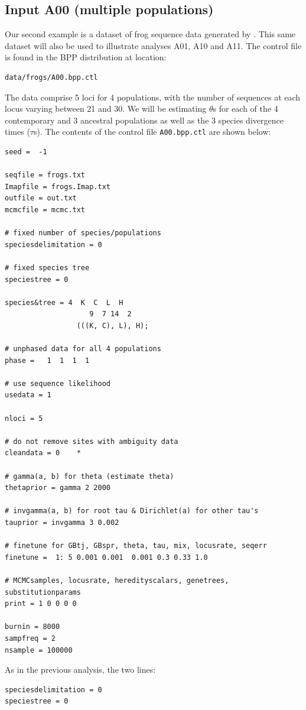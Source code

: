 \documentclass{book}
\numberwithin{equation}{section} \renewcommand{\baselinestretch}{0.55}
\begin{document}
\subsection{Input A00 (multiple populations)}
Our second example is a dataset of frog sequence data generated by \cite{Zhou2012}.
This same dataset will also be used to illustrate analyses A01, A10 and A11.
The control file is found in the BPP distribution at location:
\begin{verbatim}
data/frogs/A00.bpp.ctl
\end{verbatim}
The data comprise 5 loci for 4 populations, with the number of sequences at each locus varying
between 21 and 30. We will be estimating $\theta$s for each of the 4 contemporary and 3 ancestral populations
as well as the 3 species divergence times ($\tau$s). The contents of the control file
\texttt{A00.bpp.ctl} are shown below:
{\small
\begin{verbatim}
seed =  -1

seqfile = frogs.txt
Imapfile = frogs.Imap.txt
outfile = out.txt
mcmcfile = mcmc.txt

# fixed number of species/populations
speciesdelimitation = 0 

# fixed species tree
speciestree = 0

species&tree = 4  K  C  L  H
                    9  7 14  2
                 (((K, C), L), H);

# unphased data for all 4 populations
phase =   1  1  1  1

# use sequence likelihood                  
usedata = 1

nloci = 5  

# do not remove sites with ambiguity data
cleandata = 0    * 

# gamma(a, b) for theta (estimate theta)
thetaprior = gamma 2 2000 

# invgamma(a, b) for root tau & Dirichlet(a) for other tau's
tauprior = invgamma 3 0.002 

# finetune for GBtj, GBspr, theta, tau, mix, locusrate, seqerr
finetune =  1: 5 0.001 0.001  0.001 0.3 0.33 1.0  

# MCMCsamples, locusrate, heredityscalars, genetrees, substitutionparams
print = 1 0 0 0 0   

burnin = 8000
sampfreq = 2
nsample = 100000
\end{verbatim}
}
\noindent
As in the previous analysis, the two lines:
\begin{verbatim}
speciesdelimitation = 0 
speciestree = 0
\end{verbatim}
\end{document}
